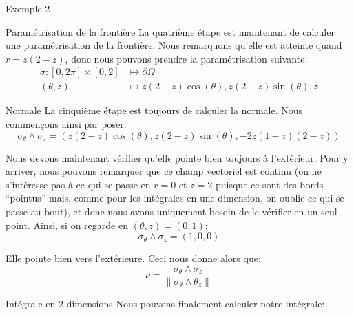 \documentclass[a4paper]{article}
\begin{document}
\begin{parag}{Exemple 2}
    \begin{subparag}{Paramétrisation de la frontière}
        La quatrième étape est maintenant de calculer une paramétrisation de la frontière. Nous remarquons qu'elle est atteinte quand $r = z\left(2-z\right)$, donc nous pouvons prendre la paramétrisation suivante:
        \[\begin{split}
        \sigma: \left[0, 2\pi\right] \times \left[0, 2\right] &\longmapsto \partial \Omega \\
        \left(\theta,  z\right) &\longmapsto z\left(2-z\right)\cos\left(\theta\right), z\left(2-z\right)\sin\left(\theta\right), z
        \end{split}\]
    \end{subparag}
    
    \begin{subparag}{Normale}
        La cinquième étape est toujours de calculer la normale. Nous commençons ainsi par poser: 
        \[\sigma_{\theta} \wedge \sigma_z = \left(z\left(2-z\right)\cos\left(\theta\right), z\left(2-z\right)\sin\left(\theta\right), -2z\left(1-z\right)\left(2-z\right)\right)\]

        Nous devons maintenant vérifier qu'elle pointe bien toujours à l'extérieur. Pour y arriver, nous pouvons remarquer que ce champ vectoriel est continu (on ne s'intéresse pas à ce qui se passe en $r = 0$ et $z = 2$ puisque ce sont des bords ``pointus'' mais, comme pour les intégrales en une dimension, on oublie ce qui se passe au bout), et donc nous avons uniquement besoin de le vérifier en un seul point. Ainsi, si on regarde en $\left(\theta, z\right) = \left(0, 1\right)$: 
        \[\sigma_{\theta} \wedge \sigma_{z} = \left(1, 0, 0\right)\]
         
        Elle pointe bien vers l'extérieure. Ceci nous donne alors que: 
        \[\nu = \frac{\sigma_{\theta} \wedge \sigma_z}{\left\|\sigma_{\theta} \wedge \theta_z\right\|}\]
    \end{subparag}
    
    \begin{subparag}{Intégrale en 2 dimensions}
        Nous pouvons finalement calculer notre intégrale: 
    \end{subparag}
\end{parag}
\end{document}
